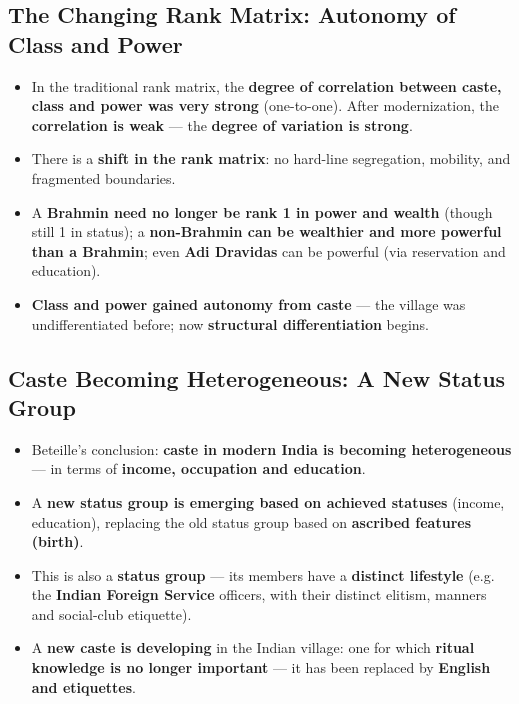 \subsection{The Changing Rank Matrix: Autonomy of Class and Power}

\begin{KeyConcept}
\begin{itemize}
\item In the traditional rank matrix, the \textbf{degree of correlation between caste, class and power was very strong} (one-to-one). After modernization, the \textbf{correlation is weak} --- the \textbf{degree of variation is strong}.
\item There is a \textbf{shift in the rank matrix}: no hard-line segregation, mobility, and fragmented boundaries.
\item A \textbf{Brahmin need no longer be rank 1 in power and wealth} (though still 1 in status); a \textbf{non-Brahmin can be wealthier and more powerful than a Brahmin}; even \textbf{Adi Dravidas} can be powerful (via reservation and education).
\item \textbf{Class and power gained autonomy from caste} --- the village was undifferentiated before; now \textbf{structural differentiation} begins.
\end{itemize}
\end{KeyConcept}

\subsection{Caste Becoming Heterogeneous: A New Status Group}

\begin{KeyConcept}
\begin{itemize}
\item Beteille's conclusion: \textbf{caste in modern India is becoming heterogeneous} --- in terms of \textbf{income, occupation and education}.
\item A \textbf{new status group is emerging based on achieved statuses} (income, education), replacing the old status group based on \textbf{ascribed features (birth)}.
\item This is also a \textbf{status group} --- its members have a \textbf{distinct lifestyle} (e.g. the \textbf{Indian Foreign Service} officers, with their distinct elitism, manners and social-club etiquette).
\item A \textbf{new caste is developing} in the Indian village: one for which \textbf{ritual knowledge is no longer important} --- it has been replaced by \textbf{English and etiquettes}.
\end{itemize}
\end{KeyConcept}

